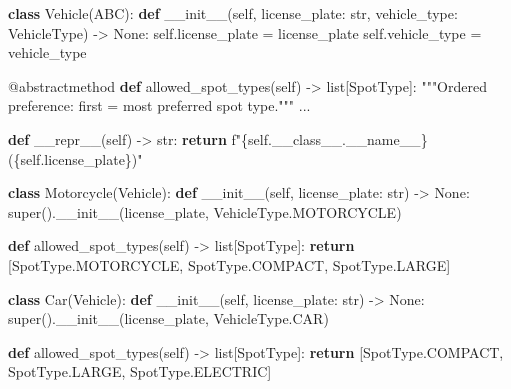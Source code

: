 \documentclass[11pt]{article}
\newenvironment{Shaded}{\begin{snugshade}}{\end{snugshade}}
\newcommand{\AttributeTok}[1]{\textcolor[rgb]{0.16,0.50,0.73}{#1}}
\newcommand{\BuiltInTok}[1]{\textcolor[rgb]{0.50,0.55,0.55}{#1}}
\newcommand{\CommentTok}[1]{\textcolor[rgb]{0.48,0.49,0.49}{#1}}
\newcommand{\ControlFlowTok}[1]{\textcolor[rgb]{0.99,0.74,0.29}{\textbf{#1}}}
\newcommand{\FunctionTok}[1]{\textcolor[rgb]{0.56,0.27,0.68}{#1}}
\newcommand{\KeywordTok}[1]{\textcolor[rgb]{0.81,0.81,0.76}{\textbf{#1}}}
\newcommand{\NormalTok}[1]{\textcolor[rgb]{0.81,0.81,0.76}{#1}}
\newcommand{\OperatorTok}[1]{\textcolor[rgb]{0.81,0.81,0.76}{#1}}
\newcommand{\SpecialCharTok}[1]{\textcolor[rgb]{0.24,0.68,0.91}{#1}}
\newcommand{\SpecialStringTok}[1]{\textcolor[rgb]{0.85,0.27,0.33}{#1}}
\newcommand{\VariableTok}[1]{\textcolor[rgb]{0.15,0.68,0.68}{#1}}
\begin{document}
\begin{Shaded}
\begin{Highlighting}[]
\KeywordTok{class}\NormalTok{ Vehicle(ABC):}
    \KeywordTok{def} \FunctionTok{\_\_init\_\_}\NormalTok{(}\VariableTok{self}\NormalTok{, license\_plate: }\BuiltInTok{str}\NormalTok{, vehicle\_type: VehicleType) }\OperatorTok{{-}\textgreater{}} \VariableTok{None}\NormalTok{:}
        \VariableTok{self}\NormalTok{.license\_plate }\OperatorTok{=}\NormalTok{ license\_plate}
        \VariableTok{self}\NormalTok{.vehicle\_type }\OperatorTok{=}\NormalTok{ vehicle\_type}

    \AttributeTok{@abstractmethod}
    \KeywordTok{def}\NormalTok{ allowed\_spot\_types(}\VariableTok{self}\NormalTok{) }\OperatorTok{{-}\textgreater{}} \BuiltInTok{list}\NormalTok{[SpotType]:}
        \CommentTok{"""Ordered preference: first = most preferred spot type."""}
\NormalTok{        ...}

    \KeywordTok{def} \FunctionTok{\_\_repr\_\_}\NormalTok{(}\VariableTok{self}\NormalTok{) }\OperatorTok{{-}\textgreater{}} \BuiltInTok{str}\NormalTok{:}
        \ControlFlowTok{return} \SpecialStringTok{f"}\SpecialCharTok{\{}\VariableTok{self}\SpecialCharTok{.}\NormalTok{\_\_class\_\_}\SpecialCharTok{.}\VariableTok{\_\_name\_\_}\SpecialCharTok{\}}\SpecialStringTok{(}\SpecialCharTok{\{}\VariableTok{self}\SpecialCharTok{.}\NormalTok{license\_plate}\SpecialCharTok{\}}\SpecialStringTok{)"}


\KeywordTok{class}\NormalTok{ Motorcycle(Vehicle):}
    \KeywordTok{def} \FunctionTok{\_\_init\_\_}\NormalTok{(}\VariableTok{self}\NormalTok{, license\_plate: }\BuiltInTok{str}\NormalTok{) }\OperatorTok{{-}\textgreater{}} \VariableTok{None}\NormalTok{:}
        \BuiltInTok{super}\NormalTok{().}\FunctionTok{\_\_init\_\_}\NormalTok{(license\_plate, VehicleType.MOTORCYCLE)}

    \KeywordTok{def}\NormalTok{ allowed\_spot\_types(}\VariableTok{self}\NormalTok{) }\OperatorTok{{-}\textgreater{}} \BuiltInTok{list}\NormalTok{[SpotType]:}
        \ControlFlowTok{return}\NormalTok{ [SpotType.MOTORCYCLE, SpotType.COMPACT, SpotType.LARGE]}


\KeywordTok{class}\NormalTok{ Car(Vehicle):}
    \KeywordTok{def} \FunctionTok{\_\_init\_\_}\NormalTok{(}\VariableTok{self}\NormalTok{, license\_plate: }\BuiltInTok{str}\NormalTok{) }\OperatorTok{{-}\textgreater{}} \VariableTok{None}\NormalTok{:}
        \BuiltInTok{super}\NormalTok{().}\FunctionTok{\_\_init\_\_}\NormalTok{(license\_plate, VehicleType.CAR)}

    \KeywordTok{def}\NormalTok{ allowed\_spot\_types(}\VariableTok{self}\NormalTok{) }\OperatorTok{{-}\textgreater{}} \BuiltInTok{list}\NormalTok{[SpotType]:}
        \ControlFlowTok{return}\NormalTok{ [SpotType.COMPACT, SpotType.LARGE, SpotType.ELECTRIC]}



\end{Highlighting}
\end{Shaded}
\end{document}

